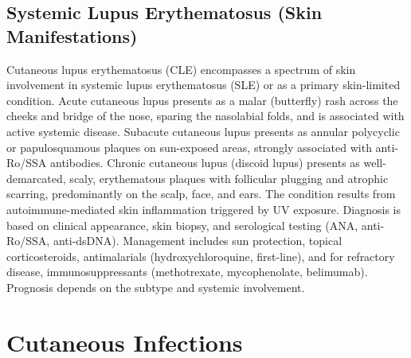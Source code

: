 \subsection{Systemic Lupus Erythematosus (Skin Manifestations)}
\label{sec:Systemic Lupus Erythematosus (Skin Manifestations)}
Cutaneous lupus erythematosus (CLE) encompasses a spectrum of skin involvement in systemic lupus erythematosus (SLE) or as a primary skin-limited condition. Acute cutaneous lupus presents as a malar (butterfly) rash across the cheeks and bridge of the nose, sparing the nasolabial folds, and is associated with active systemic disease. Subacute cutaneous lupus presents as annular polycyclic or papulosquamous plaques on sun-exposed areas, strongly associated with anti-Ro/SSA antibodies. Chronic cutaneous lupus (discoid lupus) presents as well-demarcated, scaly, erythematous plaques with follicular plugging and atrophic scarring, predominantly on the scalp, face, and ears. The condition results from autoimmune-mediated skin inflammation triggered by UV exposure. Diagnosis is based on clinical appearance, skin biopsy, and serological testing (ANA, anti-Ro/SSA, anti-dsDNA). Management includes sun protection, topical corticosteroids, antimalarials (hydroxychloroquine, first-line), and for refractory disease, immunosuppressants (methotrexate, mycophenolate, belimumab). Prognosis depends on the subtype and systemic involvement.

\section{Cutaneous Infections}








